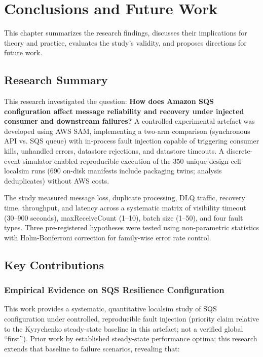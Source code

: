 \chapter{Conclusions and Future Work}

This chapter summarizes the research findings, discusses their implications for theory and practice, evaluates the study's validity, and proposes directions for future work.

\section{Research Summary}

This research investigated the question: \textbf{How does Amazon SQS configuration affect message reliability and recovery under injected consumer and downstream failures?} A controlled experimental artefact was developed using AWS SAM, implementing a two-arm comparison (synchronous API vs. SQS queue) with in-process fault injection capable of triggering consumer kills, unhandled errors, datastore rejections, and datastore timeouts. A discrete-event simulator enabled reproducible execution of the 350 unique design-cell localsim runs (690 on-disk manifests include packaging twins; analysis deduplicates) without AWS costs.

The study measured message loss, duplicate processing, DLQ traffic, recovery time, throughput, and latency across a systematic matrix of visibility timeout (30–900 seconds), maxReceiveCount (1–10), batch size (1–50), and four fault types. Three pre-registered hypotheses were tested using non-parametric statistics with Holm-Bonferroni correction for family-wise error rate control.

\section{Key Contributions}

\subsection{Empirical Evidence on SQS Resilience Configuration}

This work provides a systematic, quantitative localsim study of SQS configuration under controlled, reproducible fault injection (priority claim relative to the Kyrychenko steady-state baseline in this artefact; not a verified global ``first''). Prior work by \citet{Kyrychenko2025} established steady-state performance optima; this research extends that baseline to failure scenarios, revealing that:

